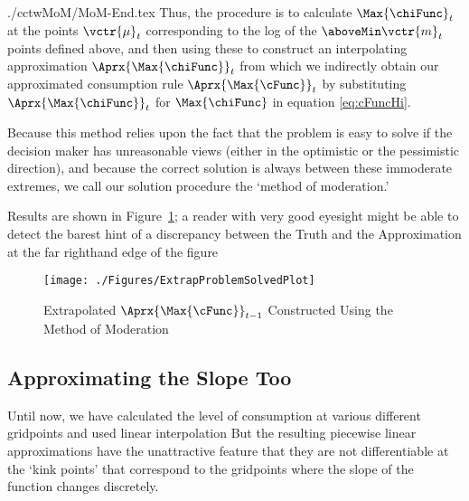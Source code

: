 \documentclass[SolvingMicroDSOPs]{subfiles}
\begin{document}
\begin{verbatimwrite}{./cctwMoM/MoM-End.tex}
  Thus, the procedure is to calculate $\Max{\chiFunc}_{\prd}$ at the points
  $\vctr{\mu}_{\prd}$ corresponding to the log of the $\aboveMin
  \vctr{m}_{\prd}$ points defined above, and then using these to construct an
  interpolating approximation $\Aprx{\Max{\chiFunc}}_{\prd}$ from which we indirectly obtain our
  approximated consumption rule $\Aprx{\Max{\cFunc}}_{\prd}$ by substituting $\Aprx{\Max{\chiFunc}}_{\prd}$ for $\Max{\chiFunc}$ in equation \eqref{eq:cFuncHi}.

  Because this method relies upon the fact that the problem is easy to
  solve if the decision maker has unreasonable views (either in the
  optimistic or the pessimistic direction), and because the correct
  solution is always between these immoderate extremes, we call our
  solution procedure the `method of moderation.'

  Results are shown in Figure~\ref{fig:ExtrapProblemSolved}; a reader
  with very good eyesight might be able to detect the barest hint of a
  discrepancy between the Truth and the Approximation at the far
  righthand edge of the figure
  \hypertarget{ExtrapProblemSolvedPlot}{}
  \begin{figure}
    \texttt{[image: ./Figures/ExtrapProblemSolvedPlot]}
    \caption{Extrapolated $\Aprx{\Max{\cFunc}}_{\prd-1}$ Constructed Using the Method of Moderation}
    \label{fig:ExtrapProblemSolved}
  \end{figure}
\end{verbatimwrite}
\unskip

\hypertarget{approximating-the-slope-too}{}
\subsection{Approximating the Slope Too}


Until now, we have calculated the level of consumption at various different gridpoints and used linear interpolation  But the resulting piecewise linear approximations have the unattractive feature that they are not differentiable at the `kink points' that correspond to the gridpoints where the slope of the function changes discretely.
\end{document}
